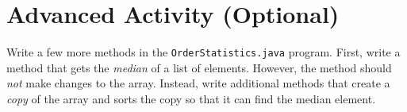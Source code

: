 \documentclass[12pt]{scrartcl}
\begin{document}
\section{Advanced Activity (Optional)}

Write a few more methods in the \texttt{OrderStatistics.java} program.  First,
write a method that gets the \emph{median} of a list of elements.  However, the
method should \emph{not} make changes to the array.  Instead, write additional
methods that create a \emph{copy} of the array and sorts the copy so that it can
find the median element.  
\end{document}
